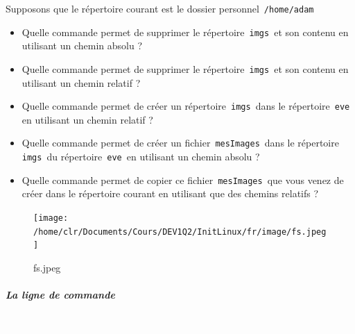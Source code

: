 \documentclass[11pt,a4paper]{article}
\begin{document}
							Supposons que le r\'epertoire courant est le dossier personnel \,\verb|/home/adam|\,
					\begin{itemize}
				
			\item 
										Quelle commande permet de supprimer le r\'epertoire \,\verb|imgs|\, et son contenu en utilisant un chemin absolu ?
										 \textcolor{gray}{\underline{\hspace*{16em}}} 
			\item 
										Quelle commande permet de supprimer le r\'epertoire \,\verb|imgs|\, et son contenu en utilisant un chemin relatif ?
										 \textcolor{gray}{\underline{\hspace*{10em}}} 
			\item 
										Quelle commande permet de cr\'eer un r\'epertoire \,\verb|imgs|\, 
										dans le r\'epertoire \,\verb|eve|\, en utilisant un chemin relatif ?
										 \textcolor{gray}{\underline{\hspace*{16em}}} 
			\item 
										Quelle commande permet de cr\'eer un fichier \,\verb|mesImages|\, 
										dans le r\'epertoire \,\verb|imgs|\, du r\'epertoire \,\verb|eve|\, en utilisant un chemin absolu ?
										 \textcolor{gray}{\underline{\hspace*{16em}}} 
			\item 
										Quelle commande permet de copier ce fichier \,\verb|mesImages|\, 
										que vous venez de cr\'eer dans le r\'epertoire courant en utilisant que des chemins relatifs ?
										 \textcolor{gray}{\underline{\hspace*{16em}}} 
					\end{itemize}
				\begin{figure}[hbt]
				    \begin{center}
					\texttt{[image: /home/clr/Documents/Cours/DEV1Q2/InitLinux/fr/image/fs.jpeg]}
						\end{center}
                
                    \caption[fs.jpeg]{fs.jpeg}
                \end{figure}
                    
            \par
        
			
		\subparagraph{La ligne de commande} 
		
                \textcolor{white}{.} \par
            
\end{document}
